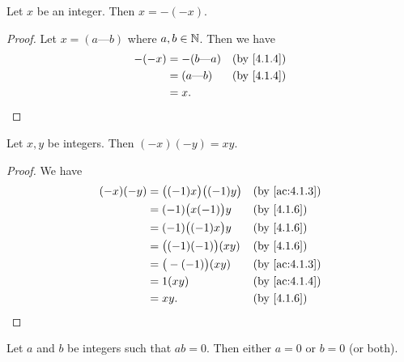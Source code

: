\begin{ac}\label{ac:4.1.4}
  Let \(x\) be an integer.
  Then \(x = -(-x)\).
\end{ac}

\begin{proof}
  Let \(x = (a \text{---} b)\) where \(a, b \in \mathbb{N}\).
  Then we have
  \begin{align*}
    -(-x) & = -(b \text{---} a) &  & \text{(by \cref{4.1.4})} \\
          & = (a \text{---} b)  &  & \text{(by \cref{4.1.4})} \\
          & = x.
  \end{align*}
\end{proof}

\begin{ac}\label{ac:4.1.5}
  Let \(x, y\) be integers.
  Then \((-x)(-y) = xy\).
\end{ac}

\begin{proof}
  We have
  \begin{align*}
    (-x)(-y) & = \big((-1)x\big) \big((-1)y\big) &  & \text{(by \cref{ac:4.1.3})} \\
             & = (-1)\big(x(-1)\big)y            &  & \text{(by \cref{4.1.6})}    \\
             & = (-1)\big((-1)x\big)y            &  & \text{(by \cref{4.1.6})}    \\
             & = \big((-1)(-1)\big)(xy)          &  & \text{(by \cref{4.1.6})}    \\
             & = \big(-(-1)\big)(xy)             &  & \text{(by \cref{ac:4.1.3})} \\
             & = 1(xy)                           &  & \text{(by \cref{ac:4.1.4})} \\
             & = xy.                             &  & \text{(by \cref{4.1.6})}
  \end{align*}
\end{proof}

\begin{prop}\label{4.1.8}
  Let \(a\) and \(b\) be integers such that \(ab = 0\).
  Then either \(a = 0\) or \(b = 0\) (or both).
\end{prop}

